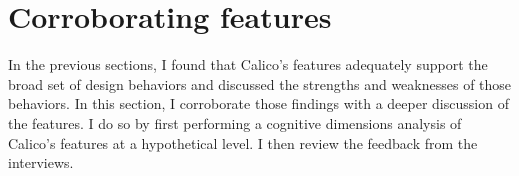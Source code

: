 




\section{Corroborating features}
\label{discussion:corroborating-features}

In the previous sections, I found that Calico's features adequately support the broad set of design behaviors and discussed the strengths and weaknesses of those behaviors. In this section, I corroborate those findings with a deeper discussion of the features. I do so by first performing a cognitive dimensions analysis of Calico's features at a hypothetical level. I then review the feedback from the interviews.

